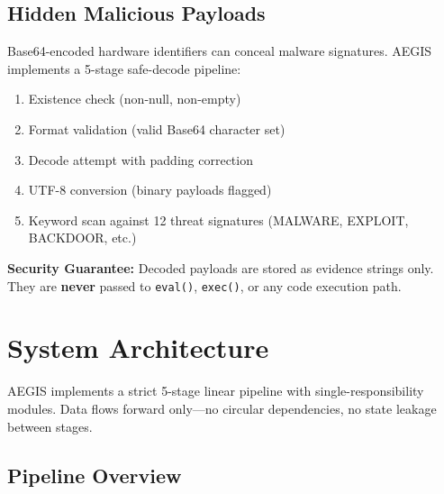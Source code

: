 \documentclass[12pt,a4paper]{article}
\begin{document}
\subsection{Hidden Malicious Payloads}

Base64-encoded hardware identifiers can conceal malware signatures. AEGIS implements a 5-stage safe-decode pipeline:

\begin{enumerate}[noitemsep]
    \item Existence check (non-null, non-empty)
    \item Format validation (valid Base64 character set)
    \item Decode attempt with padding correction
    \item UTF-8 conversion (binary payloads flagged)
    \item Keyword scan against 12 threat signatures (MALWARE, EXPLOIT, BACKDOOR, etc.)
\end{enumerate}

\begin{infobox}
\textbf{Security Guarantee:} Decoded payloads are stored as evidence strings only. They are \textbf{never} passed to \texttt{eval()}, \texttt{exec()}, or any code execution path.
\end{infobox}

\section{System Architecture}

AEGIS implements a strict 5-stage linear pipeline with single-responsibility modules. Data flows forward only---no circular dependencies, no state leakage between stages.

\subsection{Pipeline Overview}
\end{document}
